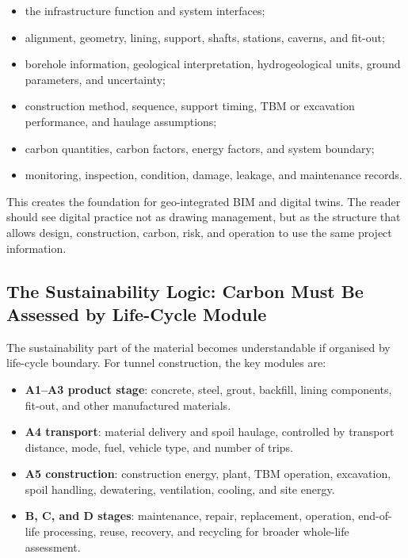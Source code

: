 \documentclass[11pt]{article}
\begin{document}
\begin{itemize}
  \item the infrastructure function and system interfaces;
  \item alignment, geometry, lining, support, shafts, stations, caverns, and
  fit-out;
  \item borehole information, geological interpretation, hydrogeological units,
  ground parameters, and uncertainty;
  \item construction method, sequence, support timing, TBM or excavation
  performance, and haulage assumptions;
  \item carbon quantities, carbon factors, energy factors, and system boundary;
  \item monitoring, inspection, condition, damage, leakage, and maintenance
  records.
\end{itemize}

This creates the foundation for geo-integrated BIM and digital twins. The
reader should see digital practice not as drawing management, but as the
structure that allows design, construction, carbon, risk, and operation to use
the same project information.

\subsection{The Sustainability Logic: Carbon Must Be Assessed by Life-Cycle Module}

The sustainability part of the material becomes understandable if organised by
life-cycle boundary. For tunnel construction, the key modules are:

\begin{itemize}
  \item \textbf{A1--A3 product stage}: concrete, steel, grout, backfill, lining
  components, fit-out, and other manufactured materials.
  \item \textbf{A4 transport}: material delivery and spoil haulage, controlled
  by transport distance, mode, fuel, vehicle type, and number of trips.
  \item \textbf{A5 construction}: construction energy, plant, TBM operation,
  excavation, spoil handling, dewatering, ventilation, cooling, and site energy.
  \item \textbf{B, C, and D stages}: maintenance, repair, replacement,
  operation, end-of-life processing, reuse, recovery, and recycling for broader
  whole-life assessment.
\end{itemize}
\end{document}
